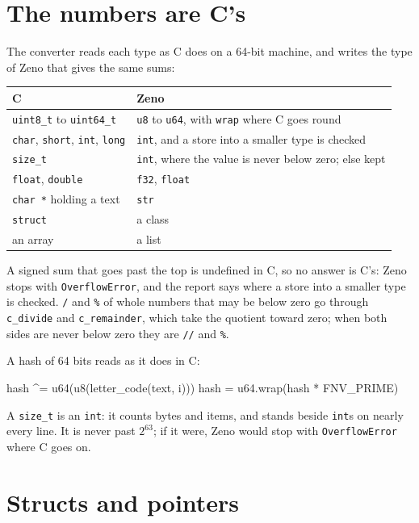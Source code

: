 \section{The numbers are C's}

The converter reads each type as C does on a 64-bit machine, and
writes the type of Zeno that gives the same sums:

\begin{center}
\begin{tabular}{lP{7cm}}
\toprule
C & Zeno \\
\midrule
\verb|uint8_t| to \verb|uint64_t| & \verb|u8| to \verb|u64|, with
  \verb|wrap| where C goes round \\
\verb|char|, \verb|short|, \verb|int|, \verb|long| & \verb|int|, and a
  store into a smaller type is checked \\
\verb|size_t| & \verb|int|, where the value is never below zero;
  else kept \\
\verb|float|, \verb|double| & \verb|f32|, \verb|float| \\
\verb|char *| holding a text & \verb|str| \\
\verb|struct| & a class \\
an array & a list \\
\bottomrule
\end{tabular}
\end{center}

A signed sum that goes past the top is undefined in C, so no answer is
C's: Zeno stops with \verb|OverflowError|, and the report says where a
store into a smaller type is checked. \verb|/| and \verb|%| of whole
numbers that may be below zero go through \verb|c_divide| and
\verb|c_remainder|, which take the quotient toward zero; when both
sides are never below zero they are \verb|//| and \verb|%|.

A hash of 64 bits reads as it does in C:

\begin{zenofrag}
hash ^= u64(u8(letter_code(text, i)))
hash = u64.wrap(hash * FNV_PRIME)
\end{zenofrag}

\begin{note}
A \verb|size_t| is an \verb|int|: it counts bytes and items, and
stands beside \verb|int|s on nearly every line. It is never past
$2^{63}$; if it were, Zeno would stop with \verb|OverflowError| where C
goes on.
\end{note}

\section{Structs and pointers}

